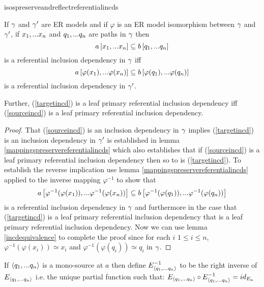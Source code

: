 isospreserveandreflectreferentialincds
\begin{lemma}
\label{isospreserveandreflectreferentialincds}
If $\gamma$ and $\gamma'$ are ER models and  if  $\varphi$ is an ER model isomorphism between $\gamma$  and $\gamma'$,  
if $x_1,...x_n$ and $q_1,...q_n$ are paths in 
$\gamma$
then 
\begin{equation}
\label{sourceincd}
a\left[x_1,...x_n\right]\subseteq b\left[q_1,...q_n\right]
\end{equation}
is a referential inclusion dependency in $\gamma$ 
iff 
\begin{equation}
\label{targetincd}
a\left[\varphi(x_1),...\varphi(x_n)\right]\subseteq b\left[\varphi(q_1),...\varphi(q_n)\right]
\end{equation}
is a referential inclusion dependency in $\gamma'$. 

Further, (\ref{targetincd}) is a leaf primary referential inclusion dependency  iff (\ref{sourceincd}) is a leaf primary referential inclusion dependency.
\end{lemma}
\begin{proof}
That (\ref{sourceincd}) is an inclusion dependency in $\gamma$ implies 
(\ref{targetincd}) is an inclusion dependency in $\gamma'$ is established in lemma
\ref{mappingspreservereferentialincds} which also
establishes that if (\ref{sourceincd}) is a leaf primary referential inclusion dependency
then so to is (\ref{targetincd}). To establish the reverse implication use lemma
\ref{mappingspreservereferentialincds} applied to the inverse mapping $\varphi^{-1}$
to show that
\begin{equation}
a\left[\varphi^{-1}(\varphi(x_1)),...\varphi^{-1}(\varphi(x_n))\right]\subseteq b\left[\varphi^{-1}(\varphi(q_1)),...\varphi^{-1}(\varphi(q_n))\right]
\end{equation}
is a referential inclusion dependency in $\gamma$  and furthermore in the case that
(\ref{targetincd}) is a leaf primary referential inclusion dependency that is
a leaf primary referential inclusion dependency.
Now we can use lemma
\ref{incdequivalence} to complete the proof since for each  $i$ $ 1 \leq i \leq n$, $\varphi^{-1}(\varphi(x_i)) \simeq x_i$ and $\varphi^{-1}(\varphi(q_i))\simeq q_i$ in $\gamma$. 
\end{proof}

If $\langle q_1,...q_n\rangle$ is a mono-source at $a$ then define $E_{\langle q_1,...q_n\rangle}^{-1}$ to be the right inverse of
$E_{\langle q_1,...q_n\rangle}$ i.e. the unique partial function such that:
$E_{\langle q_1,...q_n\rangle} \circ E_{\langle q_1,...q_n\rangle}^{-1} = id_{E_a}$

